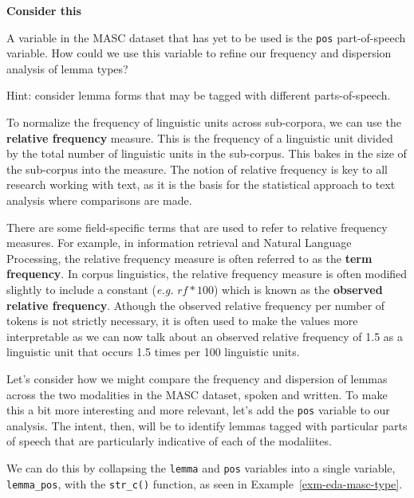 \documentclass[
  letterpaper,
  DIV=11,
  numbers=noendperiod]{scrreport}
\theoremstyle{definition}
\theoremstyle{remark}
\begin{document}
\begin{tcolorbox}[enhanced jigsaw, leftrule=.75mm, bottomrule=.15mm, opacityback=0, breakable, left=2mm, colback=white, toprule=.15mm, arc=.35mm, rightrule=.15mm]

\textbf{ Consider this}

A variable in the MASC dataset that has yet to be used is the
\texttt{pos} part-of-speech variable. How could we use this variable to
refine our frequency and dispersion analysis of lemma types?

Hint: consider lemma forms that may be tagged with different
parts-of-speech.

\end{tcolorbox}

To normalize the frequency of linguistic units across sub-corpora, we
can use the \textbf{relative frequency} measure. This is the frequency
of a linguistic unit divided by the total number of linguistic units in
the sub-corpus. This bakes in the size of the sub-corpus into the
measure. The notion of relative frequency is key to all research working
with text, as it is the basis for the statistical approach to text
analysis where comparisons are made.

There are some field-specific terms that are used to refer to relative
frequency measures. For example, in information retrieval and Natural
Language Processing, the relative frequency measure is often referred to
as the \textbf{term frequency}. In corpus linguistics, the relative
frequency measure is often modified slightly to include a constant
(\emph{e.g.} \(rf * 100\)) which is known as the \textbf{observed
relative frequency}. Athough the observed relative frequency per number
of tokens is not strictly necessary, it is often used to make the values
more interpretable as we can now talk about an observed relative
frequency of 1.5 as a linguistic unit that occurs 1.5 times per 100
linguistic units.

Let's consider how we might compare the frequency and dispersion of
lemmas across the two modalities in the MASC dataset, spoken and
written. To make this a bit more interesting and more relevant, let's
add the \texttt{pos} variable to our analysis. The intent, then, will be
to identify lemmas tagged with particular parts of speech that are
particularly indicative of each of the modaliites.

We can do this by collapsing the \texttt{lemma} and \texttt{pos}
variables into a single variable, \texttt{lemma\_pos}, with the
\texttt{str\_c()} function, as seen in Example~\ref{exm-eda-masc-type}.
\end{document}
